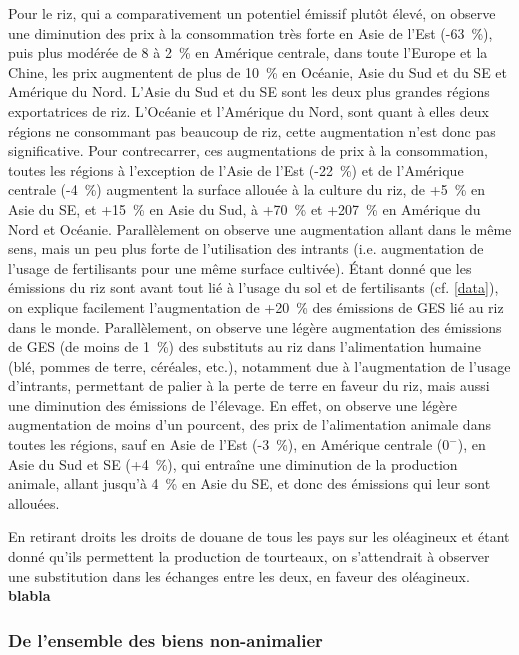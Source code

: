 Pour le riz, qui a comparativement un potentiel émissif plutôt élevé, on observe une diminution des prix à la consommation très forte en Asie de l'Est (-63~\%), puis plus modérée de 8 à 2~\% en Amérique centrale, dans toute l'Europe et la Chine, les prix augmentent de plus de 10~\% en Océanie, Asie du Sud et du SE et Amérique du Nord. L'Asie du Sud et du SE sont les deux plus grandes régions exportatrices de riz. L'Océanie et l'Amérique du Nord, sont quant à elles deux régions ne consommant pas beaucoup de riz, cette augmentation n'est donc pas significative. Pour contrecarrer, ces augmentations de prix à la consommation, toutes les régions à l'exception de l'Asie de l'Est (-22~\%) et de l'Amérique centrale (-4~\%) augmentent la surface allouée à la culture du riz, de +5~\% en Asie du SE, et +15~\% en Asie du Sud, à +70~\% et +207~\% en Amérique du Nord et Océanie. Parallèlement on observe une augmentation allant dans le même sens, mais un peu plus forte de l'utilisation des intrants (i.e. augmentation de l'usage de fertilisants pour une même surface cultivée). Étant donné que les émissions du riz sont avant tout lié à l'usage du sol et de fertilisants (cf. \ref{data}), on explique facilement l'augmentation de +20~\% des émissions de GES lié au riz dans le monde. Parallèlement, on observe une légère augmentation des émissions de GES (de moins de 1~\%) des substituts au riz dans l'alimentation humaine (blé, pommes de terre, céréales, etc.), notamment due à l'augmentation de l'usage d'intrants, permettant de palier à la perte de terre en faveur du riz, mais aussi une diminution des émissions de l'élevage. En effet, on observe une légère augmentation de moins d'un pourcent, des prix de l'alimentation animale dans toutes les régions, sauf en Asie de l'Est (-3~\%), en Amérique centrale ($0^-$), en Asie du Sud et SE (+4~\%), qui entraîne une diminution de la production animale, allant jusqu'à 4~\% en Asie du SE, et donc des émissions qui leur sont allouées.

En retirant droits les droits de douane de tous les pays sur les oléagineux et étant donné qu'ils permettent la production de tourteaux, on s'attendrait à observer une substitution dans les échanges entre les deux, en faveur des oléagineux. \textbf{blabla}

\subsubsection{De l'ensemble des biens non-animalier}\label{sousec_all_non_kl}

